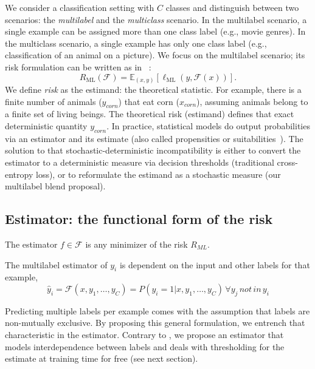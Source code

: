 We consider a classification setting with $C$ classes and distinguish between two scenarios: the \emph{multilabel} and the \emph{multiclass} scenario. 
In the multilabel scenario, a single example can be assigned more than one class label (e.g., movie genres). 
In the multiclass scenario, a single example has only one class label  (e.g., classification of an animal on a picture). 
We focus on the multilabel scenario; its risk formulation can be written as in ~\citep{multilabelReduction}:
%
\begin{equation}
R_{\mathrm{ML}}(\mathcal{F}) = \mathbb{E}_{(x, y)}\left[\ell_{\mathrm{ML}}(y, \mathcal{F}(x))\right].
\end{equation}
%
We define \emph{risk} as the estimand: the theoretical statistic. For example, there is a finite number of animals ($y_{corn}$) that eat corn ($x_{corn}$), assuming animals belong to a finite set of living beings. The theoretical risk (estimand) defines that exact deterministic quantity $y_{corn}$. 
In practice, statistical models do output probabilities via an estimator and its estimate (also called propensities or suitabilities~\citep{multilabelReduction}). The solution to that stochastic-deterministic incompatibility is either to convert the estimator to a deterministic measure via decision thresholds (traditional cross-entropy loss), or to reformulate the estimand as a stochastic measure (our multilabel blend proposal).

\subsection{Estimator: the functional form of the risk}
\label{section:background:estimator}

The estimator $f \in \mathcal{F}$ is any minimizer of the risk $R_{ML}$. 

\begin{proposition}
  The multilabel estimator of $y_i$ is dependent on the input and other labels for that example,
%
\begin{equation}
  \hat{y}_i = \mathcal{F}(x, y_1, \ldots, y_C) = P(y_i = 1 | x, y_1, \ldots, y_C) \, \forall y_j \, not \, in \, y_i
\end{equation}
\label{eq:estimand}
\end{proposition}
%
Predicting multiple labels per example comes with the assumption that labels are non-mutually exclusive. By proposing this general formulation, we entrench that characteristic in the estimator. Contrary to \citet{multilabelReduction}, we propose an estimator that models interdependence between labels and deals with thresholding for the estimate at training time for free (see next section).



